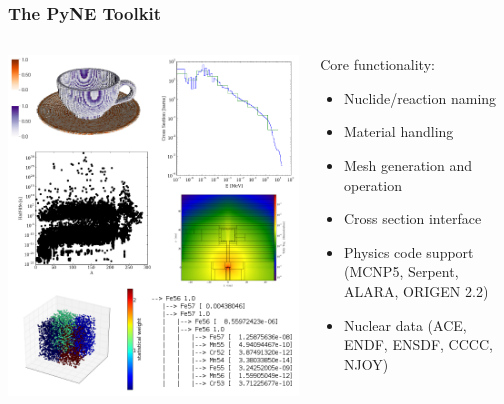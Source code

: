 \documentclass[12pt]{beamer}
\begin{document}
\begin{frame}[fragile]
\frametitle{The PyNE Toolkit}

\begin{columns}
\begin{column}{0.5\textwidth}
\includegraphics[width=\textwidth]{figures/pyne_splash.png}
\end{column}
\begin{column}{0.5\textwidth}
Core functionality:
\begin{itemize}
\item{Nuclide/reaction naming}
\item{Material handling}
\item{Mesh generation and operation}
\item{Cross section interface}
\item{Physics code support (MCNP5, Serpent, ALARA, ORIGEN 2.2)}
\item{Nuclear data (ACE, ENDF, ENSDF, CCCC, NJOY)}
\end{itemize}
\end{column}
\end{columns}

\end{frame}
\end{document}

